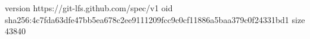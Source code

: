 version https://git-lfs.github.com/spec/v1
oid sha256:4c7fda63dfe47bb5ea678c2ee9111209fcc9c0cf11886a5baa379c0f24331bd1
size 43840
